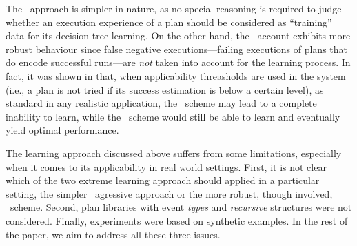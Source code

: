 The \CL\ approach is simpler in nature, as no special reasoning is required to
judge whether an execution experience of a plan should be considered as
``training'' data for its decision tree learning.
On the other hand, the \BUL\ account exhibits more robust behaviour since false
negative executions---failing executions of plans that do encode successful
runs---are \emph{not} taken into account for the learning process.
In fact, it was shown in \cite{Singh:AAMAS10} that, when applicability
threasholds are used in the system (i.e., a plan is not tried if its success
estimation is below a certain level), as standard in any realistic application,
the \CL\ scheme may lead to a complete inability to learn, while the \BUL\ scheme
would still be able to learn and eventually yield optimal performance.


The learning approach discussed above suffers from some limitations, especially
when it comes to its applicability in real world settings.
First, it is not clear which of the two extreme learning approach should applied
in a particular setting, the simpler \CL\ agressive approach or the more robust,
though involved, \BUL\ scheme.
Second, plan libraries with event \emph{types} and \emph{recursive} structures
were not considered.
Finally, experiments were based on synthetic examples.
In the rest of the paper, we aim to address all these three issues.










